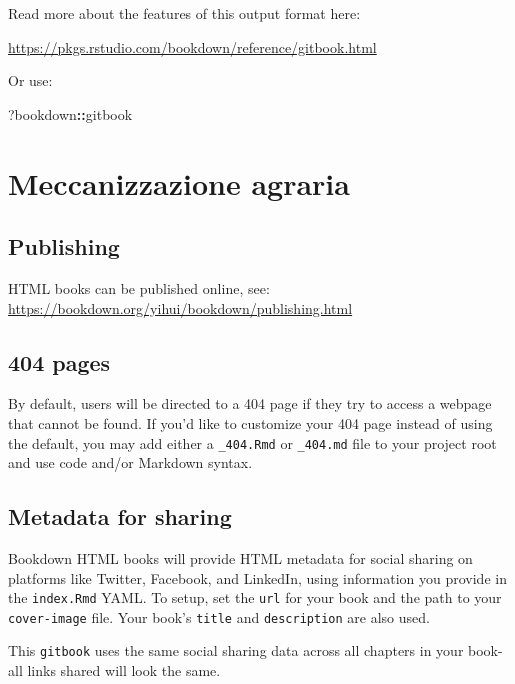 \documentclass[
]{book}
\newenvironment{Shaded}{\begin{snugshade}}{\end{snugshade}}
\newcommand{\NormalTok}[1]{#1}
\newcommand{\SpecialCharTok}[1]{\textcolor[rgb]{0.81,0.36,0.00}{\textbf{#1}}}
\theoremstyle{definition}
\theoremstyle{definition}
\theoremstyle{definition}
\theoremstyle{definition}
\theoremstyle{remark}
\begin{document}
Read more about the features of this output format here:

\url{https://pkgs.rstudio.com/bookdown/reference/gitbook.html}

Or use:

\begin{Shaded}
\begin{Highlighting}[]
\NormalTok{?bookdown}\SpecialCharTok{::}\NormalTok{gitbook}
\end{Highlighting}
\end{Shaded}

\hypertarget{meccanizzazione-agraria}{%
\chapter{Meccanizzazione agraria}\label{meccanizzazione-agraria}}

\hypertarget{publishing}{%
\section{Publishing}\label{publishing}}

HTML books can be published online, see: \url{https://bookdown.org/yihui/bookdown/publishing.html}

\hypertarget{pages-2}{%
\section{404 pages}\label{pages-2}}

By default, users will be directed to a 404 page if they try to access a webpage that cannot be found. If you'd like to customize your 404 page instead of using the default, you may add either a \texttt{\_404.Rmd} or \texttt{\_404.md} file to your project root and use code and/or Markdown syntax.

\hypertarget{metadata-for-sharing-2}{%
\section{Metadata for sharing}\label{metadata-for-sharing-2}}

Bookdown HTML books will provide HTML metadata for social sharing on platforms like Twitter, Facebook, and LinkedIn, using information you provide in the \texttt{index.Rmd} YAML. To setup, set the \texttt{url} for your book and the path to your \texttt{cover-image} file. Your book's \texttt{title} and \texttt{description} are also used.

This \texttt{gitbook} uses the same social sharing data across all chapters in your book- all links shared will look the same.
\end{document}
